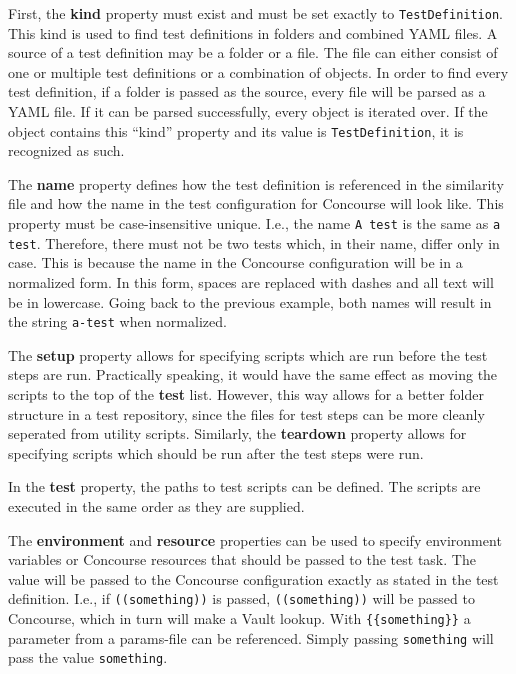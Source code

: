First, the \textbf{kind} property must exist and must be set exactly to \verb|TestDefinition|.
This kind is used to find test definitions in folders and combined YAML files.
A source of a test definition may be a folder or a file.
The file can either consist of one or multiple test definitions or a combination of objects.
In order to find every test definition, if a folder is passed as the source, every file will be parsed as a YAML file.
If it can be parsed successfully, every object is iterated over.
If the object contains this ``kind'' property and its value is \verb|TestDefinition|, it is recognized as such.

The \textbf{name} property defines how the test definition is referenced in the similarity file and how the name in the test configuration for Concourse will look like.
This property must be case-insensitive unique.
I.e., the name \verb|A test| is the same as \verb|a test|.
Therefore, there must not be two tests which, in their name, differ only in case.
This is because the name in the Concourse configuration will be in a normalized form.
In this form, spaces are replaced with dashes and all text will be in lowercase.
Going back to the previous example, both names will result in the string \verb|a-test| when normalized.

The \textbf{setup} property allows for specifying scripts which are run before the test steps are run.
Practically speaking, it would have the same effect as moving the scripts to the top of the \textbf{test} list.
However, this way allows for a better folder structure in a test repository, since the files for test steps can be more cleanly seperated from utility scripts.
Similarly, the \textbf{teardown} property allows for specifying scripts which should be run after the test steps were run.

In the \textbf{test} property, the paths to test scripts can be defined.
The scripts are executed in the same order as they are supplied.

The \textbf{environment} and \textbf{resource} properties can be used to specify environment variables or Concourse resources that should be passed to the test task.
The value will be passed to the Concourse configuration exactly as stated in the test definition.
I.e., if \verb|((something))| is passed, \verb|((something))| will be passed to Concourse, which in turn will make a Vault lookup.
With \verb|{{something}}| a parameter from a params-file can be referenced.
Simply passing \verb|something| will pass the value \verb|something|.

